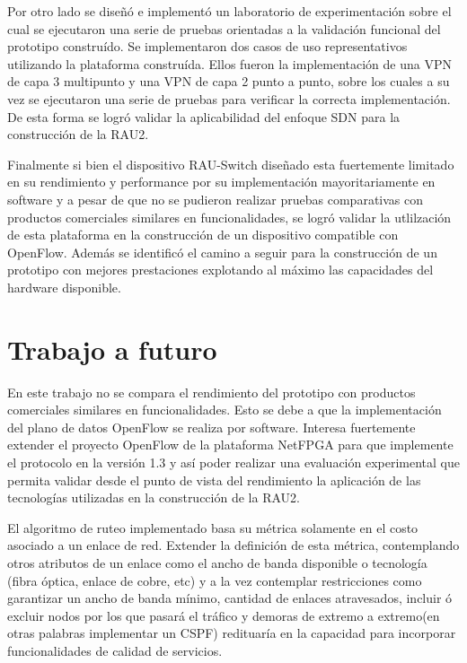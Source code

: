 Por otro lado se diseñ\'o e implement\'o un laboratorio de experimentaci\'on sobre el cual se ejecutaron una serie de pruebas orientadas a la validaci\'on funcional del prototipo constru\'ido. Se implementaron dos casos de uso representativos utilizando la plataforma constru\'ida. Ellos fueron la implementaci\'on de una VPN de capa 3 multipunto y una VPN de capa 2 punto a punto, sobre los cuales a su vez se ejecutaron una serie de pruebas para verificar la correcta implementaci\'on. De esta forma se logr\'o validar la aplicabilidad del enfoque SDN para la construcci\'on de la RAU2.

Finalmente si bien el dispositivo RAU-Switch diseñado esta fuertemente limitado en su rendimiento y performance por su implementaci\'on mayoritariamente en software y a pesar de que no se pudieron realizar pruebas comparativas con productos comerciales similares en funcionalidades, se logr\'o validar la utlilzaci\'on de esta plataforma en la construcci\'on de un dispositivo compatible con OpenFlow. Adem\'as se identific\'o el camino a seguir para la construcci\'on de un prototipo con mejores prestaciones explotando al m\'aximo las capacidades del hardware disponible.  

\section{Trabajo a futuro}
En este trabajo no se compara el rendimiento del prototipo con productos comerciales similares en funcionalidades. Esto se debe a que la implementaci\'on del plano de datos OpenFlow se realiza por software. Interesa fuertemente extender el proyecto OpenFlow de la plataforma NetFPGA para que implemente el protocolo en la versi\'on 1.3 y as\'i poder realizar una evaluaci\'on experimental que permita validar desde el punto de vista del rendimiento la aplicaci\'on de las tecnolog\'ias utilizadas en la construcci\'on de la RAU2.

El algoritmo de ruteo implementado basa su m\'etrica solamente en el costo asociado a un enlace de red. Extender la definici\'on de esta m\'etrica, contemplando otros atributos de un enlace como el ancho de banda disponible o tecnolog\'ia (fibra \'optica, enlace de cobre, etc) y a la vez contemplar restricciones como garantizar un ancho de banda m\'inimo, cantidad de enlaces atravesados, incluir \'o excluir nodos por los que pasar\'a el tr\'afico y demoras de extremo a extremo(en otras palabras implementar un CSPF) redituaría en la capacidad para incorporar funcionalidades de calidad de servicios.

